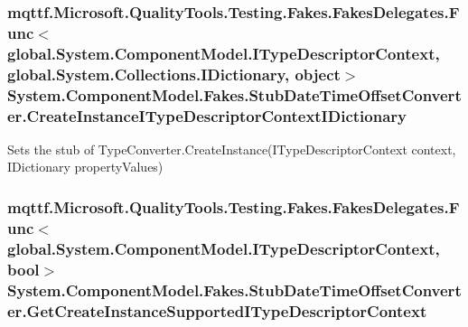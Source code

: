 \hypertarget{class_system_1_1_component_model_1_1_fakes_1_1_stub_date_time_offset_converter_a42b85c3c4640e0d5294ce1aabdaefa5b}{
\subsubsection[{Create\-Instance\-I\-Type\-Descriptor\-Context\-I\-Dictionary}]{\setlength{\rightskip}{0pt plus 5cm}mqttf.\-Microsoft.\-Quality\-Tools.\-Testing.\-Fakes.\-Fakes\-Delegates.\-Func$<$global.\-System.\-Component\-Model.\-I\-Type\-Descriptor\-Context, global.\-System.\-Collections.\-I\-Dictionary, object$>$ System.\-Component\-Model.\-Fakes.\-Stub\-Date\-Time\-Offset\-Converter.\-Create\-Instance\-I\-Type\-Descriptor\-Context\-I\-Dictionary}}\label{class_system_1_1_component_model_1_1_fakes_1_1_stub_date_time_offset_converter_a42b85c3c4640e0d5294ce1aabdaefa5b}


Sets the stub of Type\-Converter.\-Create\-Instance(\-I\-Type\-Descriptor\-Context context, I\-Dictionary property\-Values)

\hypertarget{class_system_1_1_component_model_1_1_fakes_1_1_stub_date_time_offset_converter_a3aa5c71748756f77d55839a5c74cf3aa}{
\subsubsection[{Get\-Create\-Instance\-Supported\-I\-Type\-Descriptor\-Context}]{\setlength{\rightskip}{0pt plus 5cm}mqttf.\-Microsoft.\-Quality\-Tools.\-Testing.\-Fakes.\-Fakes\-Delegates.\-Func$<$global.\-System.\-Component\-Model.\-I\-Type\-Descriptor\-Context, bool$>$ System.\-Component\-Model.\-Fakes.\-Stub\-Date\-Time\-Offset\-Converter.\-Get\-Create\-Instance\-Supported\-I\-Type\-Descriptor\-Context}}\label{class_system_1_1_component_model_1_1_fakes_1_1_stub_date_time_offset_converter_a3aa5c71748756f77d55839a5c74cf3aa}


